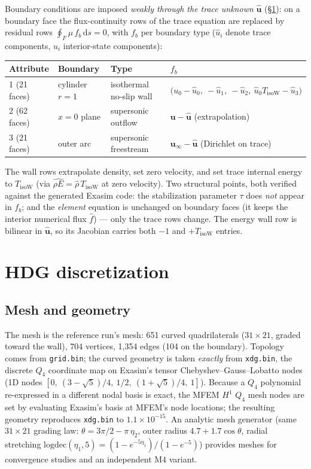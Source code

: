 \documentclass[11pt]{article}
\newcommand{\bu}{\mathbf{u}}
\newcommand{\buh}{\widehat{\mathbf{u}}}
\newcommand{\code}[1]{\texttt{#1}}
\begin{document}
Boundary conditions are imposed \emph{weakly through the trace unknown}
$\buh$ (\S\ref{sec:hdg}): on a boundary face the flux-continuity rows of the
trace equation are replaced by residual rows
$\oint_F \mu\, f_b\,\mathrm{d}s = 0$, with $f_b$ per boundary type
($\hat u_i$ denote trace components, $u_i$ interior-state components):
\begin{center}
\begin{tabular}{llll}
\toprule
Attribute & Boundary & Type & $f_b$ \\
\midrule
1 (21 faces) & cylinder $r=1$ & isothermal no-slip wall &
$\bigl(u_0-\hat u_0,\ -\hat u_1,\ -\hat u_2,\
\hat u_0 T_{\mathrm{isoW}} - \hat u_3\bigr)$\\
2 (62 faces) & $x=0$ plane & supersonic outflow &
$\bu - \buh$ (extrapolation)\\
3 (21 faces) & outer arc & supersonic freestream &
$\bu_\infty - \buh$ (Dirichlet on trace)\\
\bottomrule
\end{tabular}
\end{center}
The wall rows extrapolate density, set zero velocity, and set trace internal
energy to $T_{\mathrm{isoW}}$ (via $\widehat{\rho E} = \hat\rho\,
T_{\mathrm{isoW}}$ at zero velocity). Two structural points, both verified
against the generated Exasim code: the stabilization parameter $\tau$ does
\emph{not} appear in $f_b$; and the \emph{element} equation is unchanged on
boundary faces (it keeps the interior numerical flux $\widehat f$) --- only
the trace rows change. The energy wall row is bilinear in $\buh$, so its
Jacobian carries both $-1$ and $+T_{\mathrm{isoW}}$ entries.

\section{HDG discretization}
\label{sec:hdg}

\subsection{Mesh and geometry}

The mesh is the reference run's mesh: 651 curved quadrilaterals
($31\times 21$, graded toward the wall), 704 vertices, 1{,}354 edges (104 on
the boundary). Topology comes from \code{grid.bin}; the curved geometry is
taken \emph{exactly} from \code{xdg.bin}, the discrete $Q_4$ coordinate map
on Exasim's tensor Chebyshev--Gauss--Lobatto nodes (1D nodes
$[0,\ (3-\sqrt5)/4,\ 1/2,\ (1+\sqrt5)/4,\ 1]$). Because a $Q_4$ polynomial
re-expressed in a different nodal basis is exact, the MFEM $H^1$ $Q_4$ mesh
nodes are set by evaluating Exasim's basis at MFEM's node locations; the
resulting geometry reproduces \code{xdg.bin} to $1.1\times10^{-15}$. An
analytic mesh generator (same $31\times21$ grading law:
$\theta = 3\pi/2 - \pi\,\eta_2$, outer radius $4.7 + 1.7\cos\theta$, radial
stretching $\mathrm{logdec}(\eta_1,5) = (1-e^{-5\eta_1})/(1-e^{-5})$)
provides meshes for convergence studies and an independent M4 variant.
\end{document}
